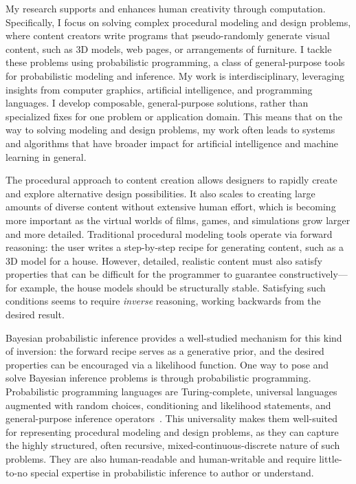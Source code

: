 \documentclass[
10pt, %
a4paper, %
oneside, %
headinclude,footinclude, %
BCOR5mm, %
]{scrartcl}
\title{\normalfont\spacedallcaps{Daniel Ritchie}} %
\author{\spacedallcaps{Research Statement}} %
\date{} %
\begin{document}

\pagestyle{scrheadings}
\clearscrheadings
\newcommand{\headertext}{\spacedlowsmallcaps{\color{black} Daniel Ritchie \color{halfgray} Research Statement}}
\ohead{\headertext}
\cfoot[\pagemark]{\pagemark}


\maketitle

My research supports and enhances human creativity through computation.
Specifically, I focus on solving complex procedural modeling and design problems, where content creators write programs that pseudo-randomly generate visual content, such as 3D models, web pages, or arrangements of furniture. I tackle these problems using probabilistic programming, a class of general-purpose tools for probabilistic modeling and inference.
My work is interdisciplinary, leveraging insights from computer graphics, artificial intelligence, and programming languages. I develop composable, general-purpose solutions, rather than specialized fixes for one problem or application domain. This means that on the way to solving modeling and design problems, my work often leads to systems and algorithms that have broader impact for artificial intelligence and machine learning in general.

The procedural approach to content creation allows designers to rapidly create and explore alternative design possibilities. It also scales to creating large amounts of diverse content without extensive human effort, which is becoming more important as the virtual worlds of films, games, and simulations grow larger and more detailed. Traditional procedural modeling tools operate via forward reasoning: the user writes a step-by-step recipe for generating content, such as a 3D model for a house. However, detailed, realistic content must also satisfy properties that can be difficult for the programmer to guarantee constructively---for example, the house models should be structurally stable. Satisfying such conditions seems to require \emph{inverse} reasoning, working backwards from the desired result.

Bayesian probabilistic inference provides a well-studied mechanism for this kind of inversion: the forward recipe serves as a generative prior, and the desired properties can be encouraged via a likelihood function. One way to pose and solve Bayesian inference problems is through probabilistic programming.
Probabilistic programming languages are Turing-complete, universal languages augmented with random choices, conditioning and likelihood statements, and general-purpose inference operators~\cite{Church}. This universality makes them well-suited for representing procedural modeling and design problems, as they can capture the highly structured, often recursive, mixed-continuous-discrete nature of such problems. They are also human-readable and human-writable and require little-to-no special expertise in probabilistic inference to author or understand.
\end{document}
